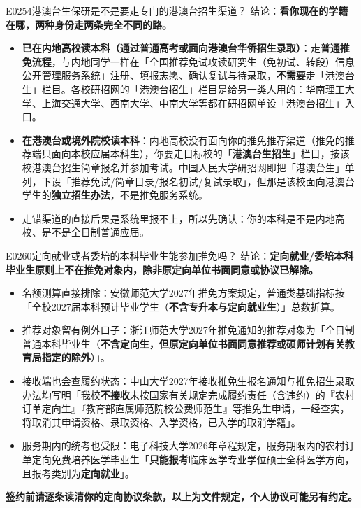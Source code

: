 \begin{qa}{E0254}{港澳台生保研是不是要走专门的港澳台招生渠道？}
结论：\textbf{看你现在的学籍在哪，两种身份走两条完全不同的路。}
\begin{itemize}
  \item \textbf{已在内地高校读本科（通过普通高考或面向港澳台华侨招生录取）}：走\textbf{普通推免流程}，与内地同学一样在「全国推荐免试攻读研究生（免初试、转段）信息公开管理服务系统」注册、填报志愿、确认复试与待录取，\textbf{不需要}走「港澳台生」栏目。各校研招网的「港澳台招生」栏目是给另一类人用的：华南理工大学、上海交通大学、西南大学、中南大学等都在研招网单设「港澳台招生」入口。
  \item \textbf{在港澳台或境外院校读本科}：内地高校没有面向你的推免推荐渠道（推免的推荐端只面向本校应届本科生），你要走目标校的「\textbf{港澳台生招生}」栏目，按该校港澳台招生简章报名并参加考试。中国人民大学研招网即把「港澳台生」单列，下设「推荐免试/简章目录/报名初试/复试录取」，但那是该校面向港澳台学生的\textbf{独立招生办法}，不是推免服务系统。
  \item 走错渠道的直接后果是系统里报不上，所以先确认：你的本科是不是内地高校、是不是全日制普通应届。
\end{itemize}
\end{qa}

\begin{qa}{E0260}{定向就业或者委培的本科毕业生能参加推免吗？}
结论：\textbf{定向就业/委培本科毕业生原则上不在推免对象内，除非原定向单位书面同意或协议已解除。}
\begin{itemize}
  \item 名额测算直接排除：安徽师范大学2027年推免方案规定，普通类基础指标按「全校2027届本科预计毕业学生（\textbf{不含专升本与定向就业生}）」总数折算。
  \item 推荐对象留有例外口子：浙江师范大学2027年推免通知的推荐对象为「全日制普通本科毕业生（\textbf{不含定向生，但原定向单位书面同意推荐或硕师计划有关教育局指定的除外}）」。
  \item 接收端也会查履约状态：中山大学2027年接收推免生报名通知与推免招生录取办法均写明「我校\textbf{不接收}未按国家有关规定完成履约责任（含违约）的『农村订单定向生』『教育部直属师范院校公费师范生』等推免生申请，一经查实，将取消其申请资格、录取资格、入学资格，已入学的取消学籍」。
  \item 服务期内的统考也受限：电子科技大学2026年章程规定，服务期限内的农村订单定向免费培养医学毕业生「\textbf{只能报考}临床医学专业学位硕士全科医学方向，且报考类别为\textbf{定向就业}」。
\end{itemize}
\textbf{签约前请逐条读清你的定向协议条款，以上为文件规定，个人协议可能另有约定。}
\end{qa}

